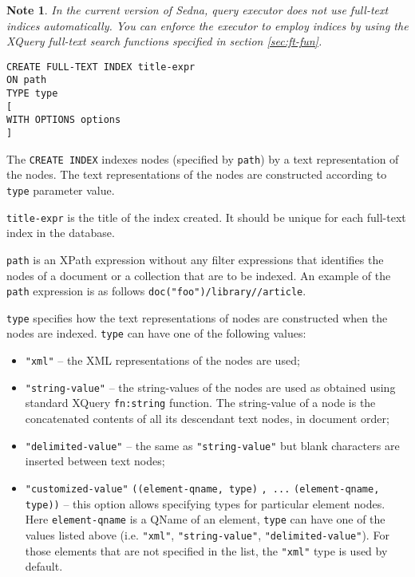 \documentclass[a4paper,12pt]{article}
\newtheorem{note}{Note}    %
\begin{document}
\begin{note}
In the current version of Sedna, query executor does not use full-text indices
automatically. You can enforce the executor to employ indices by using the
XQuery full-text search functions specified in section \ref{sec:ft-fun}.
\end{note}

\begin{verbatim}
CREATE FULL-TEXT INDEX title-expr
ON path
TYPE type
[
WITH OPTIONS options
]
\end{verbatim}

The \verb!CREATE INDEX! indexes nodes (specified by \verb!path!) by a text
representation of the nodes. The text representations of the nodes are
constructed according to \verb!type! parameter value.

\verb!title-expr! is the title of the index created. It should be unique for
each full-text index in the database.

\verb!path! is an XPath expression without any filter expressions that
identifies the nodes of a document or a collection that are to be indexed. An
example of the \verb!path! expression is as follows
\verb!doc("foo")/library//article!.

\verb!type! specifies how the text representations of nodes are constructed when
the nodes are indexed. \verb!type! can have one of the following values:

\begin{itemize}
\item \verb!"xml"! -- the XML representations of the nodes are used;
\item \verb!"string-value"! -- the string-values of the nodes are used as
obtained using standard XQuery \verb!fn:string! function. The string-value of a
node is the concatenated contents of all its descendant text nodes, in document
order;
\item \verb!"delimited-value"! -- the same as \verb!"string-value"! but blank
characters are inserted between text nodes;
\item \verb!"customized-value"! \verb!((element-qname, type)! \verb!, ...!
\verb!(element-qname, type))! -- this option allows specifying types for
particular element nodes. Here \verb!element-qname! is a QName of an element,
\verb!type! can have one of the values listed above (i.e. \verb!"xml"!,
\verb!"string-value"!, \verb!"delimited-value"!). For those elements that are
not specified in the list, the \verb!"xml"! type is used by default.
\end{itemize}
\end{document}
